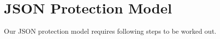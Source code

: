 \section{JSON Protection Model}

Our JSON protection model requires following steps to be worked out.



